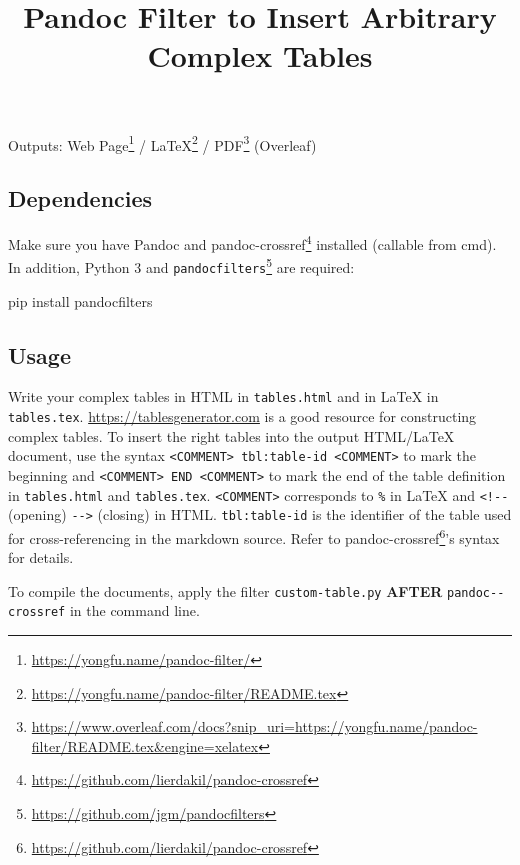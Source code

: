 \documentclass[
]{article}
\title{Pandoc Filter to Insert Arbitrary Complex Tables}
\author{}
\date{}
\newenvironment{Shaded}{}{}
\newcommand{\ExtensionTok}[1]{#1}
\newcommand{\NormalTok}[1]{#1}
\DeclareRobustCommand{\href}[2]{#2\footnote{\url{#1}}}
\begin{document}
\maketitle

Outputs: \href{https://yongfu.name/pandoc-filter/}{Web Page} /
\href{https://yongfu.name/pandoc-filter/README.tex}{LaTeX} /
\href{https://www.overleaf.com/docs?snip_uri=https://yongfu.name/pandoc-filter/README.tex\&engine=xelatex}{PDF}
(Overleaf)

\hypertarget{dependencies}{%
\subsection{Dependencies}\label{dependencies}}

Make sure you have Pandoc and
\href{https://github.com/lierdakil/pandoc-crossref}{pandoc-crossref}
installed (callable from cmd). In addition, Python 3 and
\href{https://github.com/jgm/pandocfilters}{\texttt{pandocfilters}} are
required:

\begin{Shaded}
\begin{Highlighting}[]
\ExtensionTok{pip}\NormalTok{ install pandocfilters}
\end{Highlighting}
\end{Shaded}

\hypertarget{usage}{%
\subsection{Usage}\label{usage}}

Write your complex tables in HTML in \texttt{tables.html} and in LaTeX
in \texttt{tables.tex}. \url{https://tablesgenerator.com} is a good
resource for constructing complex tables. To insert the right tables
into the output HTML/LaTeX document, use the syntax
\texttt{\textless{}COMMENT\textgreater{}\ tbl:table-id\ \textless{}COMMENT\textgreater{}}
to mark the beginning and
\texttt{\textless{}COMMENT\textgreater{}\ END\ \textless{}COMMENT\textgreater{}}
to mark the end of the table definition in \texttt{tables.html} and
\texttt{tables.tex}. \texttt{\textless{}COMMENT\textgreater{}}
corresponds to \texttt{\%} in LaTeX and \texttt{\textless{}!-\/-}
(opening) \texttt{-\/-\textgreater{}} (closing) in HTML.
\texttt{tbl:table-id} is the identifier of the table used for
cross-referencing in the markdown source. Refer to
\href{https://github.com/lierdakil/pandoc-crossref}{pandoc-crossref}'s
syntax for details.

To compile the documents, apply the filter \texttt{custom-table.py}
\textbf{AFTER} \texttt{pandoc-\/-crossref} in the command line.
\end{document}
